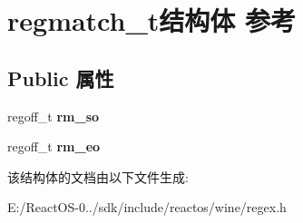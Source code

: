 \hypertarget{structregmatch__t}{}\section{regmatch\+\_\+t结构体 参考}
\label{structregmatch__t}
\subsection*{Public 属性}
\begin{DoxyCompactItemize}
\item 
\mbox{\label{structregmatch__t_a90ac8973d256eaffdbb20de676ff45a4}} 
regoff\+\_\+t {\bfseries rm\+\_\+so}
\item 
\mbox{\label{structregmatch__t_a728c28b9b23fa28c4e0b90e3a1a29efc}} 
regoff\+\_\+t {\bfseries rm\+\_\+eo}
\end{DoxyCompactItemize}


该结构体的文档由以下文件生成\+:\begin{DoxyCompactItemize}
\item 
E\+:/\+React\+O\+S-\/0../sdk/include/reactos/wine/regex.\+h\end{DoxyCompactItemize}
